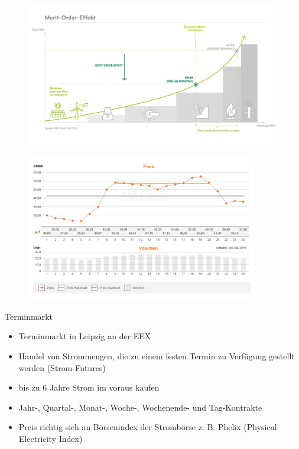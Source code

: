 \documentclass[aspectratio=1610, professionalfonts, 9pt]{beamer}
\begin{document}
\begin{frame}
  \begin{figure}
  \includegraphics[width=1\textwidth]{images/Merit.png}
\end{figure}
\end{frame}


\begin{frame}
  \begin{figure}
  \includegraphics[width=0.9\textwidth]{images/10_1_2018_spot.PNG}
\end{figure}
\end{frame}

\begin{frame}{Terminmarkt}
\begin{itemize}
  \item Terminmarkt in Leipzig an der EEX
  \item Handel von Strommengen, die zu einem festen Termin zu Verfügung gestellt werden (Strom-Futures)
  \item bis zu 6 Jahre Strom im voraus kaufen
  \item Jahr-, Quartal-, Monat-, Woche-,  Wochenende- und Tag-Kontrakte
  \item Preis richtig sich an Börsenindex der Strombörse z. B. Phelix (Physical Electricity Index)
\end{itemize}
\end{frame}
\end{document}

